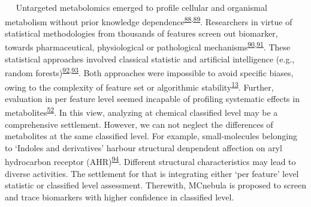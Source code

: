    Untargeted metabolomics emerged to profile cellular and organismal
metabolism without prior knowledge
dependence\textsuperscript{\protect\hyperlink{ref-2016aq}{88},\protect\hyperlink{ref-2017at}{89}}.
Researchers in virtue of statistical methodologies from thousands of
features screen out biomarker, towards pharmaceutical, physiological or
pathological
mechanisms\textsuperscript{\protect\hyperlink{ref-2016ar}{90},\protect\hyperlink{ref-2016ao}{91}}.
These statistical approaches involved classical statistic and artificial
intelligence (e.g., random
forests)\textsuperscript{\protect\hyperlink{ref-2019bv}{92},\protect\hyperlink{ref-2021de}{93}}.
Both approaches were impossible to avoid specific biases, owing to the
complexity of feature set or algorithmic
stability\textsuperscript{\protect\hyperlink{ref-2017i}{13}}. Further,
evaluation in per feature level seemed incapable of profiling systematic
effects in
metabolites\textsuperscript{\protect\hyperlink{ref-2021a}{52}}. In this
view, analyzing at chemical classified level may be a comprehensive
settlement. However, we can not neglect the differences of metabolites
at the same classified level. For example, small-molecules belonging to
`Indoles and derivatives' harbour structural denpendent affection on
aryl hydrocarbon receptor
(AHR)\textsuperscript{\protect\hyperlink{ref-2019c}{94}}. Different
structural characteristics may lead to diverse activities. The
settlement for that is integrating either `per feature' level statistic
or classified level assessment. Therewith, MCnebula is proposed to
screen and trace biomarkers with higher confidence in classified level.

